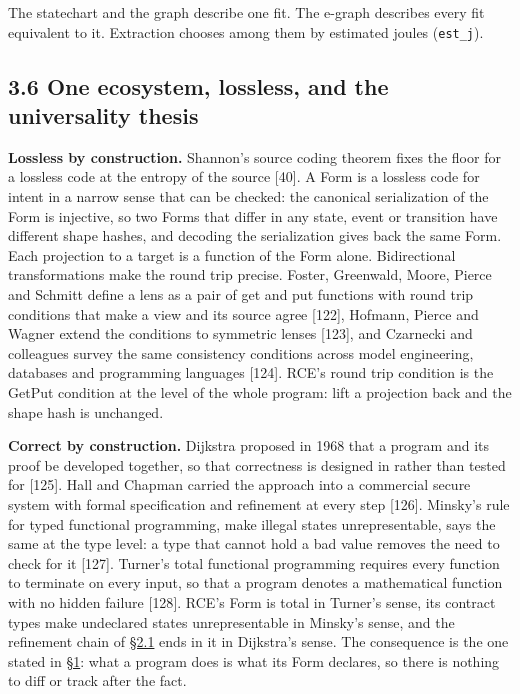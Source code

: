 \documentclass[10pt,letterpaper]{article}
\begin{document}
The statechart and the graph describe one fit. The e-graph describes
every fit equivalent to it. Extraction chooses among them by estimated
joules (\texttt{est\_j}).

\subsection{3.6 One ecosystem, lossless, and the universality
thesis}\label{one-ecosystem-lossless-and-the-universality-thesis}

\textbf{Lossless by construction.} Shannon's source coding theorem fixes
the floor for a lossless code at the entropy of the source {[}40{]}. A
Form is a lossless code for intent in a narrow sense that can be
checked: the canonical serialization of the Form is injective, so two
Forms that differ in any state, event or transition have different shape
hashes, and decoding the serialization gives back the same Form. Each
projection to a target is a function of the Form alone. Bidirectional
transformations make the round trip precise. Foster, Greenwald, Moore,
Pierce and Schmitt define a lens as a pair of get and put functions with
round trip conditions that make a view and its source agree {[}122{]},
Hofmann, Pierce and Wagner extend the conditions to symmetric lenses
{[}123{]}, and Czarnecki and colleagues survey the same consistency
conditions across model engineering, databases and programming languages
{[}124{]}. RCE's round trip condition is the GetPut condition at the
level of the whole program: lift a projection back and the shape hash is
unchanged.

\textbf{Correct by construction.} Dijkstra proposed in 1968 that a
program and its proof be developed together, so that correctness is
designed in rather than tested for {[}125{]}. Hall and Chapman carried
the approach into a commercial secure system with formal specification
and refinement at every step {[}126{]}. Minsky's rule for typed
functional programming, make illegal states unrepresentable, says the
same at the type level: a type that cannot hold a bad value removes the
need to check for it {[}127{]}. Turner's total functional programming
requires every function to terminate on every input, so that a program
denotes a mathematical function with no hidden failure {[}128{]}. RCE's
Form is total in Turner's sense, its contract types make undeclared
states unrepresentable in Minsky's sense, and the refinement chain of
\href{https://research.openie.dev/papers/rce/\#21-programming-is-coding-theory}{§2.1}
ends in it in Dijkstra's sense. The consequence is the one stated in
\href{https://research.openie.dev/papers/rce/\#1-thesis}{§1}: what a
program does is what its Form declares, so there is nothing to diff or
track after the fact.
\end{document}
